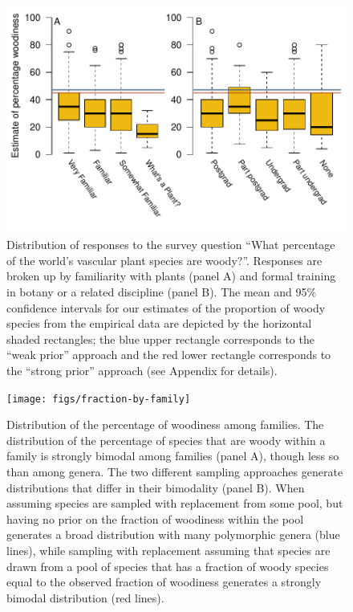 \documentclass[a4paper,12pt]{article}
\begin{document}
\begin{figure}[p]
  \centering
  \includegraphics{figs/survey-results}
  \caption{Distribution of responses to the survey question ``What
    percentage of the world's vascular plant species are
    woody?''. Responses are broken up by familiarity with plants
    (panel A) and formal training in botany or a related discipline
    (panel B). The mean and 95\% confidence intervals for our
    estimates of the proportion of woody species from the empirical
    data are depicted by the horizontal shaded rectangles; the blue
    upper rectangle corresponds to the ``weak prior'' approach and the
    red lower rectangle corresponds to the ``strong prior'' approach
    (see Appendix for details).}
  \label{fig:survey}
\end{figure}

\clearpage
\renewcommand\thefigure{S.\arabic{figure}}
\renewcommand\thetable{S.\arabic{table}}
\setcounter{figure}{0}    
\setcounter{table}{0}

\begin{figure}[p]
  \centering
  \texttt{[image: figs/fraction-by-family]}
  \caption{Distribution of the percentage of woodiness among families.
    The distribution of the percentage of species that are woody within
    a family is strongly bimodal among families (panel A), though less
    so than among genera.
    The two different sampling approaches generate distributions that
    differ in their bimodality (panel B). When assuming species are
    sampled with replacement from some pool, but having no prior on
    the fraction of woodiness within the pool generates a broad
    distribution with many polymorphic genera (blue lines), while
    sampling with replacement assuming that species are drawn from a
    pool of species that has a fraction of woody species equal to the
    observed fraction of woodiness generates a strongly bimodal
    distribution (red lines).}
  \label{fig:distribution-family}
\end{figure}
\end{document}
